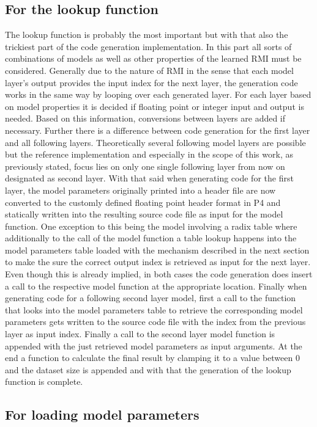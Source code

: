 \subsection{For the lookup function}
\label{sect:rmiforp4:lookup}
The lookup function is probably the most important but with that also the trickiest part of the code generation implementation. In this part all sorts of combinations of models as well as other properties of the learned RMI must be considered. Generally due to the nature of RMI in the sense that each model layer's output provides the input index for the next layer, the generation code works in the same way by looping over each generated layer. For each layer based on model properties it is decided if floating point or integer input and output is needed. Based on this information, conversions between layers are added if necessary. Further there is a difference between code generation for the first layer and all following layers. Theoretically several following model layers are possible but the reference implementation and especially in the scope of this work, as previously stated, focus lies on only one single following layer from now on designated as second layer. With that said when generating code for the first layer, the model parameters originally printed into a header file are now converted to the customly defined floating point header format in P4 and statically written into the resulting source code file as input for the model function. One exception to this being the model involving a radix table where additionally to the call of the model function a table lookup happens into the model parameters table loaded with the mechanism described in the next section to make the sure the correct output index is retrieved as input for the next layer. Even though this is already implied, in both cases the code generation does insert a call to the respective model function at the appropriate location. Finally when generating code for a following second layer model, first a call to the function that looks into the model parameters table to retrieve the corresponding model parameters gets written to the source code file with the index from the previous layer as input index. Finally a call to the second layer model function is appended with the just retrieved model parameters as input arguments. At the end a function to calculate the final result by clamping it to a value between 0 and the dataset size is appended and with that the generation of the lookup function is complete.

\subsection{For loading model parameters}
\label{sect:rmiforp4:parameters}



